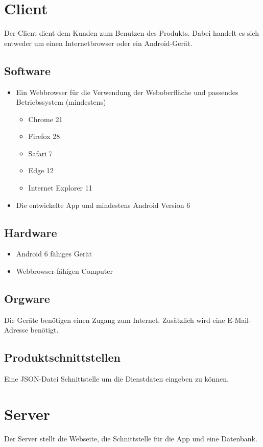 \section{Client}

Der Client dient dem Kunden zum Benutzen des Produkts.
Dabei handelt es sich entweder um einen Internetbrowser oder ein Android-Gerät.

\subsection{Software}
\begin{itemize}
\item Ein Webbrowser für die Verwendung der Weboberfläche und passendes Betriebssystem (mindestens)
	\begin{itemize}
	\item Chrome 21
	\item Firefox 28
	\item Safari 7
	\item Edge 12
	\item Internet Explorer 11
	\end{itemize}
\item Die entwickelte App und mindestens Android Version 6
\end{itemize}

\subsection{Hardware}
\begin{itemize}
\item Android 6 fähiges Gerät
\item Webbrowser-fähigen Computer
\end{itemize}

\subsection{Orgware}
Die Geräte benötigen einen Zugang zum Internet.
Zusätzlich wird eine E-Mail-Adresse benötigt.

\subsection{Produktschnittstellen}
Eine JSON-Datei Schnittstelle um die Dienstdaten eingeben zu können.


\section{Server}
Der Server stellt die Webseite, die Schnittstelle für die App und eine Datenbank.


